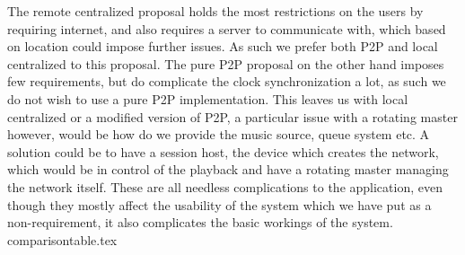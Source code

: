 The remote centralized proposal holds the most restrictions on the users by requiring internet, and also requires a server to communicate with, which based on location could impose further issues.
As such we prefer both \ac{P2P} and local centralized to this proposal.
The pure \ac{P2P} proposal on the other hand imposes few requirements, but do complicate the clock synchronization a lot, as such we do not wish to use a pure \ac{P2P} implementation.
This leaves us with local centralized or a modified version of \ac{P2P}, a particular issue with a rotating master however, would be how do we provide the music source, queue system etc.
A solution could be to have a session host, the device which creates the network, which would be in control of the playback and have a rotating master managing the network itself.
These are all needless complications to the application, even though they mostly affect the usability of the system which we have put as a non-requirement, it also complicates the basic workings of the system.
{comparisontable.tex}
